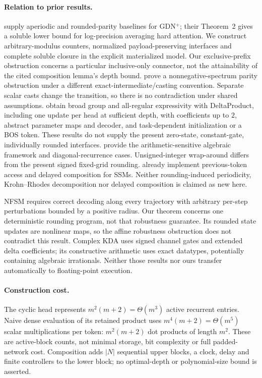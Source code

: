 \documentclass[10pt]{article}
\theoremstyle{remark}
\begin{document}
\paragraph{Relation to prior results.}
\citet[Theorem~1; Lemmas~1b--3]{statebench} supply aperiodic and
rounded-parity baselines for GDN$^+$; their Theorem~2 gives a soluble lower bound
for log-precision averaging hard attention. We construct arbitrary-modulus
counters, normalized payload-preserving interfaces and complete soluble closure
in the explicit materialized model. Our exclusive-prefix obstruction concerns
a particular inclusive-only connector, not the attainability of the cited
composition lemma's depth bound.
\citet[Theorem~1; Appendix~A.4]{grazzi} prove a nonnegative-spectrum parity
obstruction under a different exact-intermediate/casting convention. Separate
scalar casts change the transition, so there is no contradiction under shared
assumptions. \citet[Theorems~1--2; Appendix~B.1]{siems} obtain broad group and
all-regular expressivity with DeltaProduct, including one update per head at
sufficient depth, with coefficients up to $2$, abstract parameter maps and
decoder, and task-dependent initialization or a BOS token. These results do not
supply the present zero-state, constant-gate, individually rounded interfaces.
\citet[Appendix~J]{nowak} provide the arithmetic-sensitive algebraic framework
and diagonal-recurrence cases. Unsigned-integer wrap-around differs from the
present signed fixed-grid rounding. \citet[Lemmas~18, 20]{sarrof} already
implement previous-token access and delayed composition for SSMs. Neither
rounding-induced periodicity, Krohn--Rhodes decomposition nor delayed composition
is claimed as new here.

NFSM \citep[Definitions~2.1--2.2]{nfsm} requires correct decoding along every
trajectory with arbitrary per-step perturbations bounded by a positive radius.
Our theorem concerns one deterministic rounding program, not that robustness
guarantee. Its rounded state updates are nonlinear maps, so the affine
robustness obstruction does not contradict this result. Complex KDA
\citep[Theorems~3, 5; Appendix~B.4]{ckda} uses signed channel gates and extended
delta coefficients; its constructive arithmetic uses exact datatypes, potentially
containing algebraic irrationals. Neither those results nor ours transfer
automatically to floating-point execution.

\paragraph{Construction cost.}
The cyclic head represents $m^2(m+2)=\Theta(m^3)$ active recurrent entries.
Naive dense evaluation of its retained product uses
$m^4(m+2)=\Theta(m^5)$ scalar multiplications per token:
$m^2(m+2)$ dot products of length $m^2$. These are active-block counts, not
minimal storage, bit complexity or full padded-network cost. Composition adds
$|N|$ sequential upper blocks, a clock, delay and finite controllers to the
lower block; no optimal-depth or polynomial-size bound is asserted.
\end{document}

